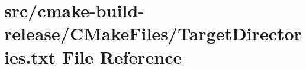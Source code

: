 \hypertarget{cmake-build-release_2CMakeFiles_2TargetDirectories_8txt}{}\section{src/cmake-\/build-\/release/\+C\+Make\+Files/\+Target\+Directories.txt File Reference}
\label{cmake-build-release_2CMakeFiles_2TargetDirectories_8txt}
